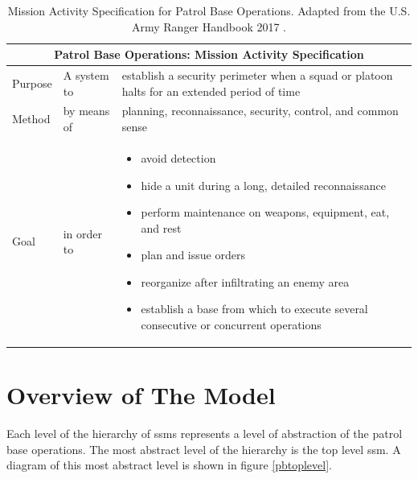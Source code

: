 \documentclass[../../main/main.tex]{subfiles}
\begin{document}
\parskip=8pt
\begin{table}[h!]
\begin{center}
\begin{tabular}{ | m{3.3em} | m{3.8cm}| m{9cm} | } 
\hline
\multicolumn{3}{|c|}{Patrol Base Operations: Mission Activity Specification} \\
\hline \hline
Purpose & A system to & establish a security perimeter when a squad or platoon halts for an extended period of time \\ 
\hline
Method & by means of  & planning, reconnaissance, security, control, and common sense  \\ 
\hline
Goal & in order to & 
\begin{itemize}
\item avoid detection
\item hide a unit during a long, detailed reconnaissance
\item perform maintenance on weapons, equipment, eat, and rest
\item plan and issue orders
\item reorganize after infiltrating an enemy area
\item establish a base from which to execute several consecutive or concurrent operations
\end{itemize}

 \\ 
\hline
\end{tabular}
\end{center}
\caption{Mission Activity Specification for Patrol Base Operations.  Adapted from the U.S. Army Ranger Handbook 2017 \cite{rangermanual}.}
\label{pbtab}
\end{table}
\parskip=18pt

%

\section{Overview of The Model}\label{sec:overview}

Each level of the hierarchy of \gls{ssm}s represents a level of abstraction of the patrol base operations. The most abstract level of the hierarchy is the top level \gls{ssm}.  A diagram of this most abstract level is shown in figure \ref{pbtoplevel}.
\end{document}
